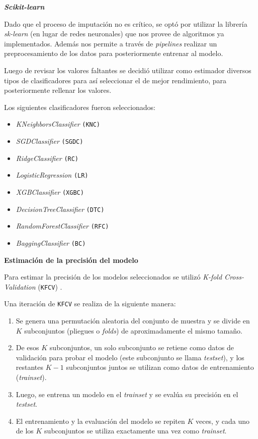 \documentclass[a4paper,12pt]{article}
\begin{document}
		\textbf{\textit{Scikit-learn}}
				
		Dado que el proceso de imputación no es crítico, se optó por utilizar la librería \textit{sk-learn} (en lugar de redes neuronales) que nos provee de algoritmos ya implementados. Además nos permite a través de \textit{pipelines} realizar un preprocesamiento de los datos para posteriormente entrenar al modelo.
				
		Luego de revisar los valores faltantes se decidió utilizar como estimador diversos tipos de clasificadores para así seleccionar el de mejor rendimiento, para posteriormente rellenar los valores.
				
		Los siguientes clasificadores fueron seleccionados:
				
		\begin{itemize}[noitemsep, topsep=2pt]
			\item \textit{KNeighborsClassifier} \texttt{(KNC)}
			\item \textit{SGDClassifier} \texttt{(SGDC)}
			\item \textit{RidgeClassifier} \texttt{(RC)}
			\item \textit{LogisticRegression} \texttt{(LR)}
			\item \textit{XGBClassifier} \texttt{(XGBC)}
			\item \textit{DecisionTreeClassifier} \texttt{(DTC)}
			\item \textit{RandomForestClassifier} \texttt{(RFC)}
			\item \textit{BaggingClassifier} \texttt{(BC)}
		\end{itemize}
				
		\hfill
				
		\textbf{Estimación de la precisión del modelo}
				
		Para estimar la precisión de los modelos seleccionados se utilizó \textit{K-fold Cross-Validation} (\texttt{KFCV}) \citep{kfolds}.
				
		Una iteración de \texttt{KFCV} se realiza de la siguiente manera: 
				
		\begin{enumerate}[noitemsep, topsep=2pt]
			\item Se genera una permutación aleatoria del conjunto de muestra y se divide en $K$ subconjuntos (pliegues o \textit{folds}) de aproximadamente el mismo tamaño.
			\item De esos $K$ subconjuntos, un solo subconjunto se retiene como datos de validación para probar el modelo (este subconjunto se llama \textit{testset}), y los restantes $K-1$ subconjuntos juntos se utilizan como datos de entrenamiento (\textit{trainset}).
			\item Luego, se entrena un modelo en el \textit{trainset} y se evalúa su precisión en el \textit{testset}. 
			\item El entrenamiento y la evaluación del modelo se repiten $K$ veces, y cada uno de los $K$ subconjuntos se utiliza exactamente una vez como \textit{trainset}.
		\end{enumerate}
				
\end{document}
